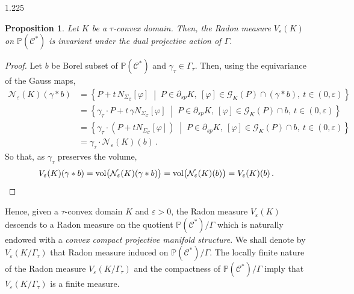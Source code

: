 \documentclass[reqno, a4paper]{amsart}
\numberwithin{equation}{section}
\numberwithin{figure}{section}
\newtheorem{proposition}[theorem]{Proposition}
\theoremstyle{definition}
\theoremstyle{remark}
\renewcommand{\P}{\mathbb{P}} %
\newcommand{\C}{\mathcal{C}} %
\renewcommand{\S}{\Sigma_\C} %
\newcommand{\G}{\mathcal{G}} %
\newcommand{\vol}{\mathrm{vol}} %
\newcommand{\st}{\; \middle\vert \;} %
\newcommand{\bp}[1]{{\bigl( {#1} \bigr)}} %
\begin{document}
\begin{spacing}{1.225}
\begin{proposition}
Let $K$ be a $\tau$-convex domain. Then, the Radon measure $V_\varepsilon(K)$ on $\P(\C^*)$ is invariant under the dual projective action of $\Gamma$. 
\end{proposition}
\begin{proof}
Let $b$ be Borel subset of $\P(\C^*)$ and $\gamma_\tau\in \Gamma_\tau$. Then, using the equivariance of the Gauss maps,
\begin{align*}
\mathcal{N}_\varepsilon(K)(\gamma*b) & = \left\lbrace P + t \, N_{\S} [\varphi]\st P \in \partial_{sp} K, \ [\varphi]\in \G_K(P)\cap (\gamma*b), \ t \in (0,\varepsilon) \right\rbrace \\
 & = \left\lbrace \gamma_\tau \cdot P + t \, \gamma N_{\S} [\varphi]\st P \in \partial_{sp} K, \ [\varphi]\in \G_K(P)\cap b, \ t \in (0,\varepsilon) \right\rbrace \\
 & = \left\lbrace \gamma_\tau \cdot( P + t N_{\S} [\varphi])\st P \in \partial_{sp} K, \ [\varphi]\in \G_K(P)\cap b, \ t \in (0,\varepsilon) \right\rbrace \\
 & = \gamma_\tau \cdot \mathcal{N}_\varepsilon(K)(b)\, . 
\end{align*}
So that, as $\gamma_\tau$ preserves the volume,
\begin{equation*}
V_\varepsilon(K)(\gamma*b) = \vol\bp{\mathcal{N}_\varepsilon(K)(\gamma*b)} = \vol \bp{\mathcal{N}_\varepsilon(K)(b)} = V_\varepsilon(K)(b) \, . \qedhere
\end{equation*}
\end{proof}

Hence, given a $\tau$-convex domain $K$ and $\varepsilon>0$, the Radon measure $V_\varepsilon(K)$ descends to a Radon measure on 
the quotient $\P(\C^*)/\Gamma$ which is naturally endowed with a \emph{convex compact projective manifold structure}. 
We shall denote by $V_\varepsilon(K/\Gamma_\tau)$ that Radon measure induced on $\P(\C^*)/\Gamma$. The locally finite nature of the Radon measure $V_\varepsilon(K/\Gamma_\tau)$ and the compactness of $\P(\C^*)/\Gamma$ imply that $V_\varepsilon(K/\Gamma_\tau)$ is a finite measure. 


\end{spacing}
\end{document}
